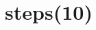     
    \def\br{\hspace*{\fill} \\* }
    \def\gt{>}
    \def\lt{<}
    \let\Oldtex\TeX
    \let\Oldlatex\LaTeX
    \renewcommand{\TeX}{\textrm{\Oldtex}}
    \renewcommand{\LaTeX}{\textrm{\Oldlatex}}
    \title{steps(10)}
    
    
    
    
    
\makeatletter
\def\PY@reset{\let\PY@it=\relax \let\PY@bf=\relax%
    \let\PY@ul=\relax \let\PY@tc=\relax%
    \let\PY@bc=\relax \let\PY@ff=\relax}
\def\PY@tok#1{\csname PY@tok@#1\endcsname}
\def\PY@toks#1+{\ifx\relax#1\empty\else%
    \PY@tok{#1}\expandafter\PY@toks\fi}
\def\PY@do#1{\PY@bc{\PY@tc{\PY@ul{%
    \PY@it{\PY@bf{\PY@ff{#1}}}}}}}
\def\PY#1#2{\PY@reset\PY@toks#1+\relax+\PY@do{#2}}

